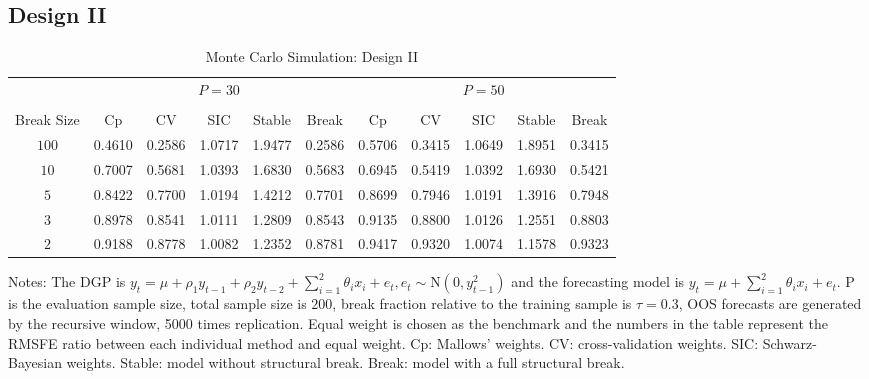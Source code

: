 \subsection{Design II}
\begin{table}
    \caption{Monte Carlo Simulation: Design II} \label{ntb:2}
    \centering
    \begin{adjustbox}{width=\textwidth,totalheight=\textheight,keepaspectratio}
    \begin{threeparttable}
    \begin{tabular}{ccccccccccc}
    \toprule
     & \multicolumn{5}{c}{$P = 30$} & \multicolumn{5}{c}{$P = 50$} \\
    \cmidrule(r){2-6}
    \cmidrule(r){7-11} \\
    Break Size      & Cp     & CV     & SIC    & Stable & Break  & Cp     & CV     & SIC    & Stable & Break  \\
    $100$           & 0.4610 &0.2586  &1.0717  & 1.9477 &0.2586  & 0.5706 &0.3415  &1.0649  & 1.8951 &0.3415 \\
    $10$            & 0.7007 &0.5681  &1.0393  & 1.6830 &0.5683  & 0.6945 &0.5419  &1.0392  & 1.6930 &0.5421 \\
    $5$             & 0.8422 &0.7700  &1.0194  & 1.4212 &0.7701  & 0.8699 &0.7946  &1.0191  & 1.3916 &0.7948 \\
    $3$             & 0.8978 &0.8541  &1.0111  & 1.2809 &0.8543  & 0.9135 &0.8800  &1.0126  & 1.2551 &0.8803 \\
    $2$             & 0.9188 &0.8778  &1.0082  & 1.2352 &0.8781  & 0.9417 &0.9320  &1.0074  & 1.1578 &0.9323 \\
    \bottomrule
    \end{tabular}
    \begin{tablenotes} \footnotesize
    Notes: The DGP is $y_{t} = \mu + \rho_{1}y_{t-1} + \rho_{2}y_{t-2} + \sum_{i=1}^{2}\theta_{i}x_{i} + e_{t}, e_{t} \sim \mathrm{N}(0, y_{t-1}^{2})$ and the forecasting model is $y_{t} = \mu + \sum_{i=1}^{2}\theta_{i}x_{i} + e_{t}$. $\mathrm{P}$ is the evaluation sample size, total sample size is $200$, break fraction relative to the training sample is $\tau = 0.3$, OOS forecasts are generated by the recursive window, 5000 times replication. Equal weight is chosen as the benchmark and the numbers in the table represent the RMSFE ratio between each individual method and equal weight. Cp: Mallows' weights. CV: cross-validation weights. SIC: Schwarz-Bayesian weights. Stable: model without structural break. Break: model with a full structural break.
    \end{tablenotes}
    \end{threeparttable}
    \end{adjustbox}
\end{table}
